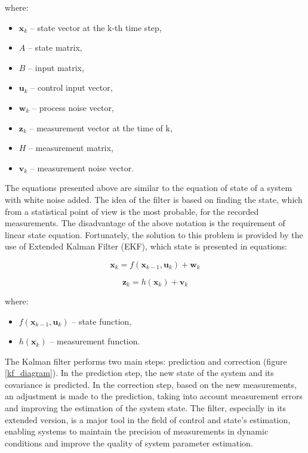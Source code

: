 where:
\begin{itemize}[noitemsep]
	\item $\bm{x}_k$ -- state vector at the k-th time step,
	\item $A$ -- state matrix, 
	\item $B$  -- input matrix, 
	\item $\bm{u}_k$  -- control input vector, 
	\item $\bm{w}_k$ -- process noise vector, 
	\item $\bm{z}_k$  -- measurement vector at the time of k, 
	\item $H$ -- measurement matrix,
	\item $\bm{v}_k$ -- measurement noise vector.
\end{itemize}

The equations presented above are similar to the equation of state of a system with white noise added. The idea of the filter is based on finding the state, which from a statistical point of view is the most probable, for the recorded measurements. The disadvantage of the above notation is the requirement of linear state equation. Fortunately, the solution to this problem is provided by the use of Extended Kalman Filter (EKF), which state is presented in equations:

\begin{equation}
	\bm{x}_k =  f \left( \bm{x}_{k-1},  \bm{u}_k \right) + \bm{w}_k
	\label{ekf1}
\end{equation}

\begin{equation}
	\bm{z}_k = h \left(\bm{x}_k \right) + \bm{v}_k
	\label{ekf2}
\end{equation}


where:
\begin{itemize}
	\item $ f \left( \bm{x}_{k-1},  \bm{u}_k \right)$ -- state function, 
	\item $h \left(\bm{x}_k \right)$ -- measurement function.
\end{itemize}

The Kalman filter performs two main steps: prediction and correction (figure \ref{kf_diagram}). In the prediction step, the new state of the system and its covariance is predicted. In the correction step, based on the new measurements, an adjustment is made to the prediction, taking into account measurement errors and improving the estimation of the system state. The filter, especially in its extended version, is a major tool in the field of control and state's estimation, enabling systems to maintain the precision of measurements in dynamic conditions and improve the quality of system parameter estimation.\\


